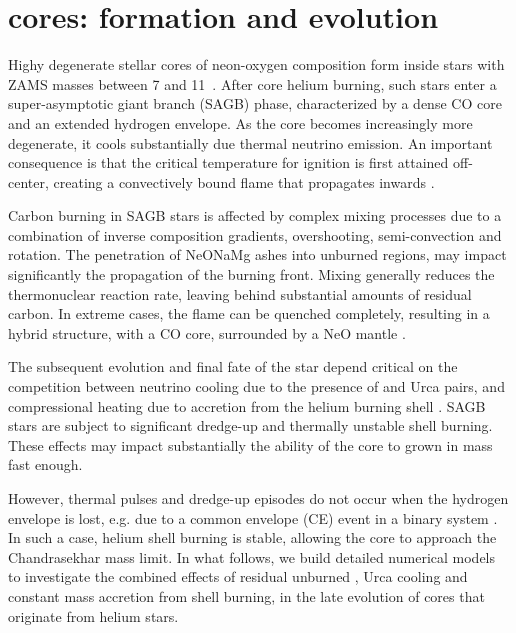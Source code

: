 \documentclass[../../main/thesis_msc.tex]{subfiles}
\begin{document}
\section{\one cores: formation and evolution}\label{sec:2}
Highy degenerate stellar cores of neon-oxygen composition form inside stars with ZAMS masses  
between  7 and 11\msun\ \citep{Farmer:2015afs,Woosley:2019sdf}. 
After core helium burning, such stars enter a super-asymptotic giant branch 
(SAGB) phase, characterized by a dense CO  
core and an  extended hydrogen envelope.  
As the core becomes increasingly more degenerate, it cools substantially 
due thermal neutrino emission. An important consequence is that the critical 
temperature for  ignition is first attained off-center, creating a 
convectively bound  flame that propagates inwards \citep{siess2006}. 

Carbon burning in SAGB stars is affected by complex mixing processes 
due to a combination of inverse composition gradients, overshooting, 
semi-convection and rotation. The penetration of 
NeONaMg ashes into unburned regions, may impact significantly the propagation of
the burning front. Mixing generally reduces the thermonuclear reaction rate, leaving 
behind substantial amounts of residual carbon. In extreme cases, the flame can be 
quenched completely, resulting in a hybrid structure,  with a CO core, 
surrounded by a NeO mantle \citep{Denissenkov:2013qaa}. 

The subsequent evolution and final fate of the star depend  critical on the competition 
between neutrino cooling due to the presence of  and 
 Urca pairs, and compressional heating due to accretion from the helium burning shell \citep{Schwab:2017epw}. 
SAGB stars are subject to significant dredge-up  and 
thermally unstable shell burning. 
These effects may impact substantially the ability of the core to grown in mass fast enough. 

However, thermal pulses and dredge-up episodes do not 
occur when the hydrogen envelope 
is lost, e.g. due to a common envelope (CE) event in a binary system \citep{Woosley:2019sdf}.  
In such a case, helium shell burning is stable, allowing  
the core to approach the Chandrasekhar mass limit. 
In what follows, we build detailed numerical models to 
investigate the combined effects 
of residual unburned , Urca cooling and constant mass accretion from shell 
burning, in the late evolution of \one cores that originate from helium stars. 
\end{document}
